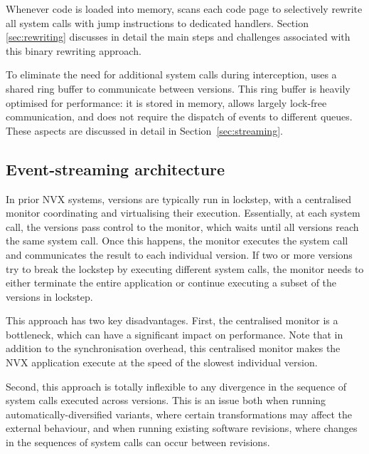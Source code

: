 Whenever code is loaded into memory, \varan scans each code page to
selectively rewrite all system calls with jump instructions to dedicated
handlers.  Section \ref{sec:rewriting} discusses in detail the main
steps and challenges associated with this binary rewriting approach.

To eliminate the need for additional system calls during interception,
\varan uses a shared ring buffer to communicate between versions.  This
ring buffer is heavily optimised for performance: it is stored in
memory, allows largely lock-free communication, and does not require
the dispatch of events to different queues.  These aspects are
discussed in detail in Section~\ref{sec:streaming}.



\subsection{Event-streaming architecture}
\label{sec:coordination}

In prior NVX systems, versions are typically run in lockstep, with a
centralised monitor coordinating and virtualising their execution.
Essentially, at each system call, the versions pass control to the
monitor, which waits until all versions reach the same system call.
Once this happens, the monitor executes the system call and
communicates the result to each individual version.  If two or more
versions try to break the lockstep by executing different system
calls, the monitor needs to either terminate the entire application or
continue executing a subset of the versions in lockstep.

This approach has two key disadvantages.  First, the centralised
monitor is a bottleneck, which can have a significant impact on
performance.  Note that in addition to the synchronisation overhead,
this centralised monitor makes the NVX application execute at the
speed of the slowest individual version.

Second, this approach is totally inflexible to any divergence in the
sequence of system calls executed across versions.  This is an issue
both when running automatically-diversified variants, where certain
transformations may affect the external behaviour, and when running
existing software revisions, where changes in the sequences of
system calls can occur between revisions. 

